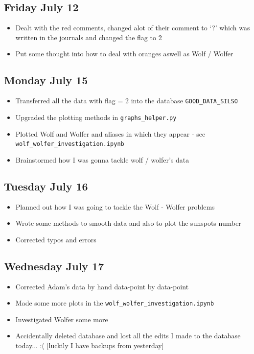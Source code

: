 \documentclass[12pt]{article}
\begin{document}
\subsection{Friday July 12}
\begin{itemize}
    \item Dealt with the red comments, changed alot of their comment to `?' which was written in the journals and changed the flag to 2
    \item Put some thought into how to deal with oranges aswell as Wolf / Wolfer
\end{itemize}

\subsection{Monday July 15}
\begin{itemize}
    \item Transferred all the data with flag = 2 into the database \texttt{GOOD\_DATA\_SILSO}
    \item Upgraded the plotting methods in \texttt{graphs\_helper.py}
    \item Plotted Wolf and Wolfer and aliases in which they appear - see \texttt{wolf\_wolfer\_investigation.ipynb}
    \item Brainstormed how I was gonna tackle wolf / wolfer's data
\end{itemize}

\subsection{Tuesday July 16}
\begin{itemize}
    \item Planned out how I was going to tackle the Wolf - Wolfer problems
    \item Wrote some methods to smooth data and also to plot the sunspots number
    \item Corrected typos and errors
\end{itemize}

\subsection{Wednesday July 17}
\begin{itemize}
    \item Corrected Adam's data by hand data-point by data-point
    \item Made some more plots in the \texttt{wolf\_wolfer\_investigation.ipynb}
    \item Investigated Wolfer some more
    \item Accidentally deleted database and lost all the edits I made to the database today... :(  [luckily I have backups from yesterday]
\end{itemize}
\end{document}

